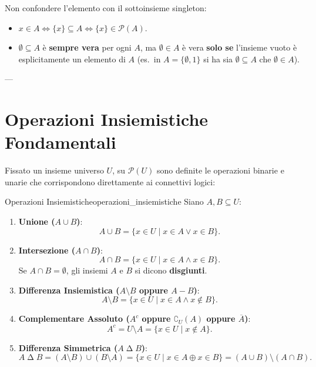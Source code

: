 \begin{esame}
Non confondere l'elemento con il sottoinsieme singleton:
\begin{itemize}
    \item $x \in A \iff \{x\} \subseteq A \iff \{x\} \in \mathcal{P}(A)$.
    \item $\emptyset \subseteq A$ è \textbf{sempre vera} per ogni $A$, ma $\emptyset \in A$ è vera \textbf{solo se} l'insieme vuoto è esplicitamente un elemento di $A$ (es.~in $A = \{\emptyset, 1\}$ si ha sia $\emptyset \subseteq A$ che $\emptyset \in A$).
\end{itemize}
\end{esame}

---

\section{Operazioni Insiemistiche Fondamentali}

Fissato un insieme universo $U$, su $\mathcal{P}(U)$ sono definite le operazioni binarie e unarie che corrispondono direttamente ai connettivi logici:

\begin{definizione}{Operazioni Insiemistiche}{operazioni_insiemistiche}
Siano $A, B \subseteq U$:
\begin{enumerate}
    \item \textbf{Unione ($A \cup B$)}:
    \begin{equation}
        A \cup B = \{x \in U \mid x \in A \lor x \in B\}.
    \end{equation}
    \item \textbf{Intersezione ($A \cap B$)}:
    \begin{equation}
        A \cap B = \{x \in U \mid x \in A \land x \in B\}.
    \end{equation}
    Se $A \cap B = \emptyset$, gli insiemi $A$ e $B$ si dicono \textbf{disgiunti}.
    \item \textbf{Differenza Insiemistica ($A \setminus B$ oppure $A - B$)}:
    \begin{equation}
        A \setminus B = \{x \in U \mid x \in A \land x \notin B\}.
    \end{equation}
    \item \textbf{Complementare Assoluto ($A^c$ oppure $\complement_U(A)$ oppure $\overline{A}$)}:
    \begin{equation}
        A^c = U \setminus A = \{x \in U \mid x \notin A\}.
    \end{equation}
    \item \textbf{Differenza Simmetrica ($A \mathbin{\Delta} B$)}:
    \begin{equation}
        A \mathbin{\Delta} B = (A \setminus B) \cup (B \setminus A) = \{x \in U \mid x \in A \oplus x \in B\} = (A \cup B) \setminus (A \cap B).
    \end{equation}
\end{enumerate}
\end{definizione}


